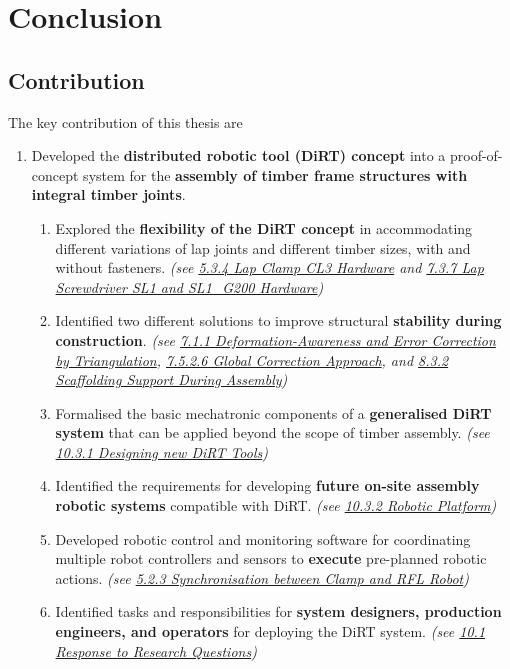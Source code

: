 \chapter{Conclusion}
\label{chapter:conclusion}

\section{Contribution}
\label{section:contribution}

The key contribution of this thesis are

\begin{enumerate}
	\item Developed the \textbf{distributed robotic tool (DiRT) concept} into a proof-of-concept system for the \textbf{assembly of timber frame structures with integral timber joints}. 
	\begin{enumerate}
		\item Explored the \textbf{flexibility of the DiRT concept} in accommodating different variations of lap joints and different timber sizes, with and without fasteners. \textit{(see \ul{5.3.4 Lap Clamp CL3 Hardware} and \ul{7.3.7 Lap Screwdriver SL1 and SL1\_G200 Hardware})}

		\item Identified two different solutions to improve structural \textbf{stability during construction}. \textit{(see \ul{7.1.1 Deformation-Awareness and Error Correction by Triangulation}, \ul{7.5.2.6 Global Correction Approach}, and \ul{8.3.2 Scaffolding Support During Assembly})}

		\item Formalised the basic mechatronic components of a \textbf{generalised DiRT system} that can be applied beyond the scope of timber assembly. \textit{(see \ul{10.3.1 Designing new DiRT Tools})}

		\item Identified the requirements for developing \textbf{future on-site assembly robotic systems} compatible with DiRT.  \textit{(see \ul{10.3.2 Robotic Platform})}

		\item Developed robotic control and monitoring software for coordinating multiple robot controllers and sensors to \textbf{execute} pre-planned robotic actions. \textit{(see \ul{5.2.3 Synchronisation between Clamp and RFL Robot})}

		\item Identified tasks and responsibilities for\textbf{ system designers, production engineers, and operators} for deploying the DiRT system. \textit{(see \ul{10.1 Response to Research Questions})}


\end{enumerate}
\end{enumerate}
